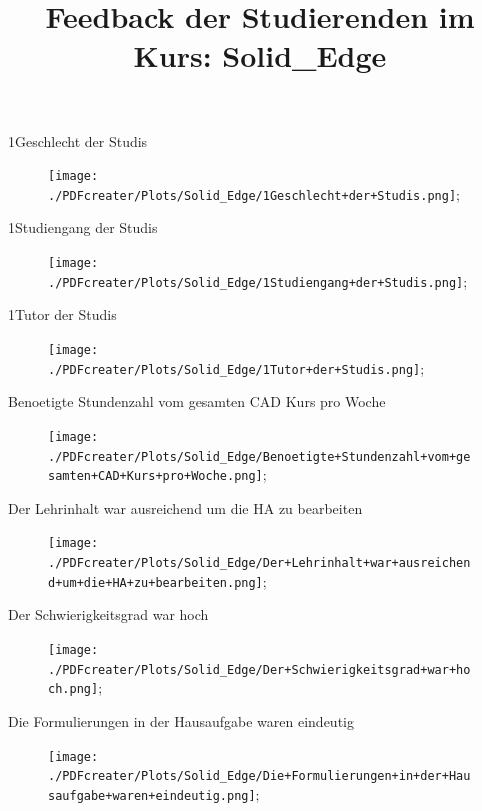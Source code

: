 \documentclass[10pt]{beamer}
\title{Feedback der Studierenden im Kurs: Solid_Edge }
\begin{document}
 
     \maketitle 
\begin{frame}[fragile]{1Geschlecht der Studis} 
 \begin{figure}
 \texttt{[image: ./PDFcreater/Plots/Solid\_Edge/1Geschlecht+der+Studis.png]};
 \end{figure}
 \end{frame}
\begin{frame}[fragile]{1Studiengang der Studis} 
 \begin{figure}
 \texttt{[image: ./PDFcreater/Plots/Solid\_Edge/1Studiengang+der+Studis.png]};
 \end{figure}
 \end{frame}
\begin{frame}[fragile]{1Tutor der Studis} 
 \begin{figure}
 \texttt{[image: ./PDFcreater/Plots/Solid\_Edge/1Tutor+der+Studis.png]};
 \end{figure}
 \end{frame}
\begin{frame}[fragile]{Benoetigte Stundenzahl vom gesamten CAD Kurs pro Woche} 
 \begin{figure}
 \texttt{[image: ./PDFcreater/Plots/Solid\_Edge/Benoetigte+Stundenzahl+vom+gesamten+CAD+Kurs+pro+Woche.png]};
 \end{figure}
 \end{frame}
\begin{frame}[fragile]{Der Lehrinhalt war ausreichend um die HA zu bearbeiten} 
 \begin{figure}
 \texttt{[image: ./PDFcreater/Plots/Solid\_Edge/Der+Lehrinhalt+war+ausreichend+um+die+HA+zu+bearbeiten.png]};
 \end{figure}
 \end{frame}
\begin{frame}[fragile]{Der Schwierigkeitsgrad war hoch} 
 \begin{figure}
 \texttt{[image: ./PDFcreater/Plots/Solid\_Edge/Der+Schwierigkeitsgrad+war+hoch.png]};
 \end{figure}
 \end{frame}
\begin{frame}[fragile]{Die Formulierungen in der Hausaufgabe waren eindeutig} 
 \begin{figure}
 \texttt{[image: ./PDFcreater/Plots/Solid\_Edge/Die+Formulierungen+in+der+Hausaufgabe+waren+eindeutig.png]};
 \end{figure}
 \end{frame}
\end{document}
